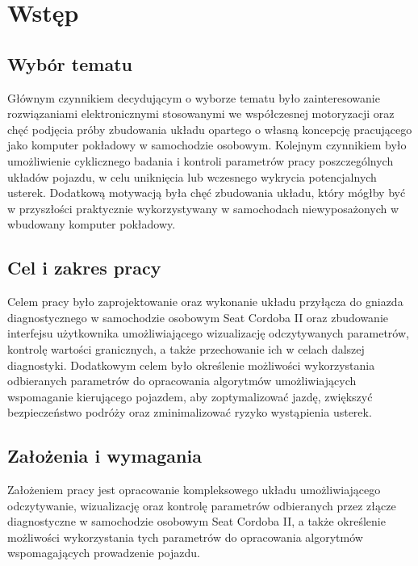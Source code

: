 \documentclass[12pt]{article} %
\numberwithin{equation}{subsection}
\numberwithin{figure}{section}
\numberwithin{table}{section}
\begin{document}
\section{Wstęp}

	\subsection{Wybór tematu}
		\hspace{0.5cm}Głównym czynnikiem decydującym o wyborze tematu było zainteresowanie rozwiązaniami elektronicznymi stosowanymi we współczesnej motoryzacji oraz chęć podjęcia próby zbudowania układu opartego o własną koncepcję pracującego jako komputer pokładowy w samochodzie osobowym. Kolejnym czynnikiem było umożliwienie cyklicznego badania i kontroli parametrów pracy poszczególnych układów pojazdu, w celu uniknięcia lub wczesnego wykrycia potencjalnych usterek. Dodatkową motywacją była chęć zbudowania układu, który mógłby być w przyszłości praktycznie wykorzystywany w samochodach niewyposażonych w wbudowany komputer pokładowy. 	
	
	\subsection{Cel i zakres pracy}
		\hspace{0.5cm}Celem pracy było zaprojektowanie oraz wykonanie układu przyłącza do gniazda diagnostycznego w samochodzie osobowym Seat Cordoba II oraz zbudowanie interfejsu użytkownika umożliwiającego wizualizację odczytywanych parametrów, kontrolę wartości granicznych, a także przechowanie ich w celach dalszej diagnostyki. Dodatkowym celem było określenie możliwości wykorzystania odbieranych parametrów do opracowania algorytmów umożliwiających wspomaganie kierującego pojazdem, aby zoptymalizować jazdę, zwiększyć bezpieczeństwo podróży oraz zminimalizować ryzyko wystąpienia usterek. 
	
	\subsection{Założenia i wymagania}
		\hspace{0.5cm}Założeniem pracy jest opracowanie kompleksowego układu umożliwiającego odczytywanie, wizualizację oraz kontrolę parametrów odbieranych przez złącze diagnostyczne w samochodzie osobowym Seat Cordoba II, a także określenie możliwości wykorzystania tych parametrów do opracowania algorytmów wspomagających prowadzenie pojazdu.
	
\end{document}
